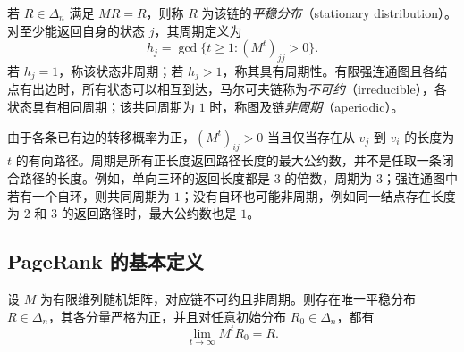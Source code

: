 \begin{definition}[平稳分布与周期]
\label{def:lihang-pr-stationarity-period}
若 $R\in\Delta_n$ 满足 $MR=R$，则称 $R$ 为该链的\emph{平稳分布}（stationary distribution）。对至少能返回自身的状态 $j$，其周期定义为
\[
    h_j=\gcd\{t\geq1:(M^t)_{jj}>0\}.
\]
若 $h_j=1$，称该状态非周期；若 $h_j>1$，称其具有周期性。有限强连通图且各结点有出边时，所有状态可以相互到达，马尔可夫链称为\emph{不可约}（irreducible），各状态具有相同周期；该共同周期为 $1$ 时，称图及链\emph{非周期}（aperiodic）。
\end{definition}

由于各条已有边的转移概率为正，$(M^t)_{ij}>0$ 当且仅当存在从 $v_j$ 到 $v_i$ 的长度为 $t$ 的有向路径。周期是所有正长度返回路径长度的最大公约数，并不是任取一条闭合路径的长度。例如，单向三环的返回长度都是 $3$ 的倍数，周期为 $3$；强连通图中若有一个自环，则共同周期为 $1$；没有自环也可能非周期，例如同一结点存在长度为 $2$ 和 $3$ 的返回路径时，最大公约数也是 $1$。

\subsection{PageRank 的基本定义}
\label{subsec:lihang-pr-basic-definition}

\begin{theorem}[有限不可约非周期链的收敛]
\label{thm:lihang-pr-finite-chain}
设 $M$ 为有限维列随机矩阵，对应链不可约且非周期。则存在唯一平稳分布 $R\in\Delta_n$，其各分量严格为正，并且对任意初始分布 $R_0\in\Delta_n$，都有
\begin{equation}
\label{eq:lihang-pr-basic-limit}
    \lim_{t\to\infty}M^tR_0=R.
\end{equation}
\end{theorem}


